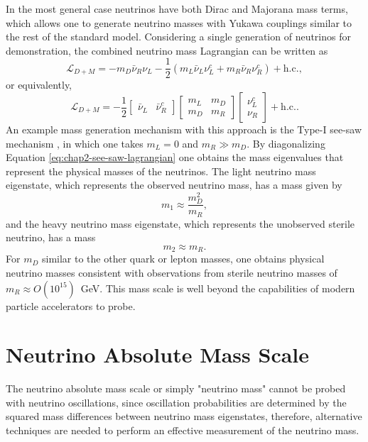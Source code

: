 In the most general case neutrinos have both Dirac and Majorana mass terms, which allows one to generate neutrino masses with Yukawa couplings similar to the rest of the standard model. Considering a single generation of neutrinos for demonstration, the combined neutrino mass Lagrangian can be written as 
\begin{equation}
    \mathcal{L}_{D+M}=-m_D\bar{\nu}_{R}\nu_{L} - \frac{1}{2}(m_L\bar{\nu}_L\nu_L^c+m_R\bar{\nu}_R\nu_R^c)+\text{h.c.},
\end{equation}
or equivalently,
\begin{equation}
    \label{eq:chap2-see-saw-lagrangian}
    \mathcal{L}_{D+M}=-\frac{1}{2}\begin{bmatrix}\bar{\nu}_L&\bar{\nu}^c_R\end{bmatrix}\begin{bmatrix}m_L&m_D\\m_D&m_R\end{bmatrix}\begin{bmatrix}\nu^c_L\\ \nu_R\end{bmatrix} + \text{h.c.}.
\end{equation}
An example mass generation mechanism with this approach is the Type-I see-saw mechanism \cite{numass_models_seesaw}, in which one takes $m_L=0$ and $m_R\gg m_D$. By diagonalizing Equation \ref{eq:chap2-see-saw-lagrangian} one obtains the mass eigenvalues that represent the physical masses of the neutrinos. The light neutrino mass eigenstate, which represents the observed neutrino mass, has a mass given by
\begin{equation}
    m_1\approx\frac{m_D^2}{m_R},
\end{equation}
and the heavy neutrino mass eigenstate, which represents the unobserved sterile neutrino, has a mass
\begin{equation}
    m_2\approx m_R.
\end{equation}
For $m_D$ similar to the other quark or lepton masses, one obtains physical neutrino masses consistent with observations from sterile neutrino masses of $m_R\approx O(10^{15})$~GeV. This mass scale is well beyond the capabilities of modern particle accelerators to probe. 

\section{Neutrino Absolute Mass Scale}
\label{sec:chap2-nu-mass-scale}

The neutrino absolute mass scale or simply "neutrino mass" cannot be probed with neutrino oscillations, since oscillation probabilities are determined by the squared mass differences between neutrino mass eigenstates, therefore, alternative techniques are needed to perform an effective measurement of the neutrino mass.

